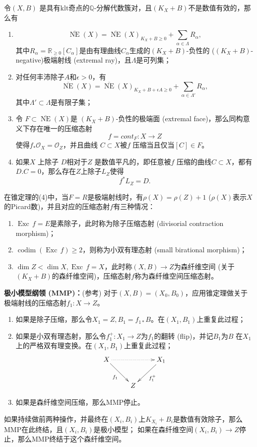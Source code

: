 \begin{theorem}[锥定理]\cite[Theorem 3.7]{km}\label{conethm}

令$(X,B)$ 是具有klt奇点的$\mathbb{Q}$-分解代数簇对，且$(K_{X}+B)$不是数值有效的，那么有
\begin{enumerate}
  \item
    \[ \overline{\operatorname{NE}}(X)=\overline{\operatorname{NE}}(X)_{K_{X}+B\geqslant 0} +\sum_{\alpha \in\Lambda} R_{\alpha},\] 
          其中$R_{\alpha}=\mathbb{R}_{\geqslant 0}[C_{\alpha}]$是由有理曲线$C_{\alpha}$生成的$(K_{X}+B) $-负性的 ($(K_{X}+B)$-negative)极端射线 (extremal ray)，且$\Lambda$是可列集；
  \item 对任何丰沛除子$A$和$ \epsilon >0 $，有
        \[ \overline{\operatorname{NE}}(X)=\overline{\operatorname{NE}}(X)_{K_{X}+B+\epsilon A\geqslant 0} +\sum_{\alpha \in\Lambda'}R_{\alpha} ,\]
        其中$\Lambda' \subset \Lambda$是有限子集；
  \item 令 $F \subset \overline{\operatorname{NE}}(X)$是 $(K_{X}+B)$-负性的极端面 (extremal face)，那么同构意义下存在唯一的压缩态射
    \[ f=cont_{F}:X \to Z \]
    使得$f_{*}\mathcal{O}_{X}=\mathcal{O}_{Z}$，并且曲线 $C \subset X$被$f$ 压缩当且仅当$[C] \in F$。 
  \item 如果$X$ 上除子 $D$相对于$Z$ 是数值平凡的，即任意被$f$ 压缩的曲线$C \subset X$，都有$D.C=0$，那么存在$Z$上除子$L_{Z} $使得
    \[ f^{*}L_{Z} = D .\]
\end{enumerate}
\end{theorem}
在锥定理的(4)中，当$F=R$是极端射线时，有$\rho(X)=\rho(Z)+1$ ($\rho(X)$表示$X$ 的Picard数)，并且对应的压缩态射$f$有三种情况：
\begin{enumerate}
  \item $\operatorname{Exc}\,f=E$是素除子，此时称为除子压缩态射 (divisorial contraction morphism)；
  \item $\operatorname{codim }(\operatorname{Exc}\,f) \geqslant 2$，则称为小双有理态射 (small birational morphism)；
  \item $\dim Z < \dim X, \operatorname{Exc}\,f=X$，此时称$(X,B)\to Z$为森纤维空间 (关于$ (K_{X}+B) $的森纤维空间)，压缩态射$f$称为森纤维空间压缩态射。
\end{enumerate}
\textbf{极小模型纲领 (MMP)：}(参考\cite{km,kmm})
对于$(X,B)=(X_{0},B_{0})$，应用锥定理做关于极端射线的压缩态射$f_{1}:X\to Z$。
\begin{enumerate}
  \item 如果是除子压缩，那么令$X_{1}=Z,B_{1}=f_{1*}B$。在$(X_{1},B_{1})$上重复此过程；
  \item 如果是小双有理态射，那么令$f^{+}_{1}:X_{1}\to Z$为$f_{1}$的翻转 (flip)，并记$B_{1}$为$B$ 在$X_{1}$上的严格双有理变换。在$(X_{1},B_{1})$上重复此过程；
    \[ \xymatrix{
        X\ar[rd]_{f_{1}} \ar@{.>}[rr] & & X_{1}\ar[ld]^{f_{1}^{+}} \\
      & Z & } \]
  \item 如果是森纤维空间压缩，那么MMP停止。
\end{enumerate}
如果持续做前两种操作，并最终在$(X_{i},B_{i})$上$K_{X_{i}}+B_{i}$是数值有效除子，那么MMP在此终结，且$(X_{i},B_{i})$是极小模型；
如果在森纤维空间$(X_{i},B_{i})\to Z$停止，那么MMP终结于这个森纤维空间。


